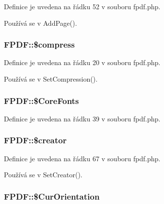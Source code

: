 Definice je uvedena na řádku 52 v souboru fpdf.\-php.



Používá se v Add\-Page().

\hypertarget{class_f_p_d_f_a6effca6f281458983c61647878f6dc18}{
\subsubsection[{\$compress}]{\setlength{\rightskip}{0pt plus 5cm}F\-P\-D\-F\-::\$compress}}\label{class_f_p_d_f_a6effca6f281458983c61647878f6dc18}


Definice je uvedena na řádku 20 v souboru fpdf.\-php.



Používá se v Set\-Compression().

\hypertarget{class_f_p_d_f_a59722e9eb7f9a67dbe330d93723204a6}{
\subsubsection[{\$\-Core\-Fonts}]{\setlength{\rightskip}{0pt plus 5cm}F\-P\-D\-F\-::\$\-Core\-Fonts}}\label{class_f_p_d_f_a59722e9eb7f9a67dbe330d93723204a6}


Definice je uvedena na řádku 39 v souboru fpdf.\-php.

\hypertarget{class_f_p_d_f_a8e24c7db53f08092a8038d7aa7d07a48}{
\subsubsection[{\$creator}]{\setlength{\rightskip}{0pt plus 5cm}F\-P\-D\-F\-::\$creator}}\label{class_f_p_d_f_a8e24c7db53f08092a8038d7aa7d07a48}


Definice je uvedena na řádku 67 v souboru fpdf.\-php.



Používá se v Set\-Creator().

\hypertarget{class_f_p_d_f_a40250e931a9dd32601bbe2a5a1eaf492}{
\subsubsection[{\$\-Cur\-Orientation}]{\setlength{\rightskip}{0pt plus 5cm}F\-P\-D\-F\-::\$\-Cur\-Orientation}}\label{class_f_p_d_f_a40250e931a9dd32601bbe2a5a1eaf492}


